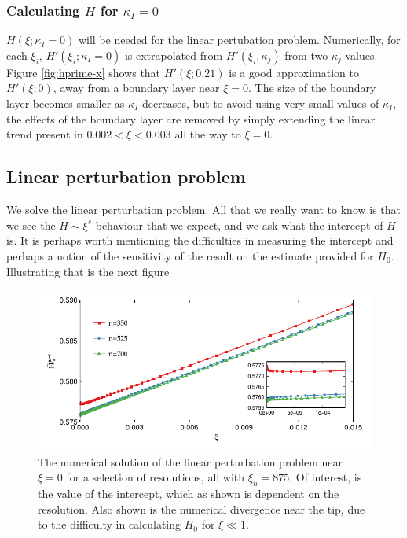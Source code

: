 \documentclass{jfm}
\begin{document}
\subsubsection{Calculating $H$ for $\kappa_I =0$}
$H(\xi ; \kappa_I=0)$ will be needed for the linear pertubation problem.
Numerically, for each $\xi_i$, $H'(\xi_i; \kappa_I = 0)$ is extrapolated
from $H'(\xi_i, \kappa_j)$ from two $\kappa_j$ values. Figure 
\ref{fig:hprime-x} shows that $H'(\xi; 0.21)$ 
is a good approximation to $H'(\xi;0)$, away from a boundary 
layer near $\xi=0$. The size of the boundary layer becomes smaller as $\kappa_I$
decreases, but to avoid using very small values of $\kappa_I$, the effects
of the boundary layer are removed by simply extending the linear trend present
in $0.002 < \xi < 0.003$ all the way to $\xi=0$.
\subsection{Linear perturbation problem}
We solve the linear perturbation problem. All that we really want to know
is that we see the $\tilde{H} \sim \xi^{s}$ behaviour that we expect, and we ask what the
intercept of $\tilde{H}$ is. It is perhaps worth mentioning the difficulties
in measuring the intercept and perhaps a notion of the sensitivity of the 
result on the estimate provided for $H_0$. Illustrating that is the next
figure 

\begin{figure}
 \centerline{
\includegraphics{./../../Graphs/linear-perturbation-plot.pdf}}
  \caption{The numerical solution of the linear perturbation problem near 
           $\xi=0$ for a selection of resolutions, all with $\xi_n = 875$. Of 
           interest, is the value of the intercept, which as shown is dependent
           on the resolution. Also shown is the numerical divergence near the 
           tip, due to the difficulty in calculating $H_0$ for $\xi \ll 1$.}
\end{figure}
\end{document}
